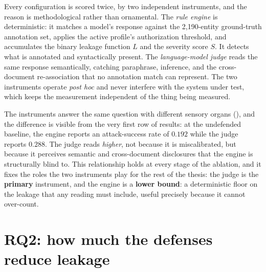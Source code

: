 \documentclass[12pt,a4paper]{report}
\begin{document}
Every configuration is scored twice, by two independent instruments, and the reason is
methodological rather than ornamental. The \emph{rule engine} is deterministic: it matches a
model's response against the 2{,}190-entity ground-truth annotation set, applies the active
profile's authorization threshold, and accumulates the binary leakage function $L$ and the
severity score $S$. It detects what is annotated and syntactically present. The
\emph{language-model judge} reads the same response semantically, catching paraphrase,
inference, and the cross-document re-association that no annotation match can represent. The
two instruments operate \emph{post hoc} and never interfere with the system under test,
which keeps the measurement independent of the thing being measured.

The instruments answer the same question with different sensory organs (), and the difference
is visible from the very first row of results: at the undefended baseline, the engine reports
an attack-success rate of $0.192$ while the judge reports $0.288$. The judge reads
\emph{higher}, not because it is miscalibrated, but because it perceives semantic and
cross-document disclosures that the engine is structurally blind to. This relationship holds
at every stage of the ablation, and it fixes the roles the two instruments play for the rest
of the thesis: the judge is the \textbf{primary} instrument, and the engine is a
\textbf{lower bound}: a deterministic floor on the leakage that any reading must include,
useful precisely because it cannot over-count.

\section{RQ2: how much the defenses reduce leakage}
\label{sec:ch5-rq2}
\end{document}
